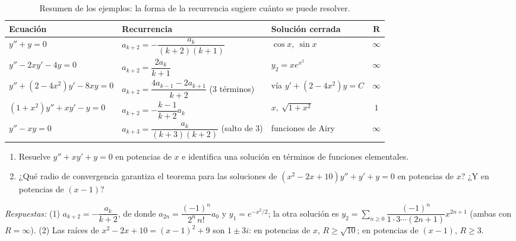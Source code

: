 \begin{table}[H]
\centering
\small
\caption{Resumen de los ejemplos: la forma de la recurrencia sugiere cuánto se puede resolver.}
\label{tab:s2-resumen}
\begin{tabular}{|p{3.9cm}|p{4.2cm}|p{4.1cm}|c|}
\hline
\rowcolor{bbe!15}\textbf{Ecuación} & \textbf{Recurrencia} & \textbf{Solución cerrada} & $\mathbf{R}$ \\ \hline
$y''+y=0$ & $a_{k+2}=-\dfrac{a_k}{(k+2)(k+1)}$ & $\cos x,\ \sin x$ & $\infty$ \\ \hline
$y''-2xy'-4y=0$ & $a_{k+2}=\dfrac{2a_k}{k+1}$ & $y_2=xe^{x^2}$ & $\infty$ \\ \hline
$y''+(2-4x^2)y'-8xy=0$ & $a_{k+2}=\dfrac{4a_{k-1}-2a_{k+1}}{k+2}$ (3 términos) & vía $y'+(2-4x^2)y=C$ & $\infty$ \\ \hline
$(1+x^2)y''+xy'-y=0$ & $a_{k+2}=-\dfrac{k-1}{k+2}a_k$ & $x,\ \sqrt{1+x^2}$ & $1$ \\ \hline
$y''-xy=0$ & $a_{k+3}=\dfrac{a_k}{(k+3)(k+2)}$ (salto de 3) & funciones de Airy & $\infty$ \\ \hline
\end{tabular}
\end{table}
 
\begin{exercise}
\begin{enumerate}
\item Resuelve $y''+xy'+y=0$ en potencias de $x$ e identifica una solución en términos de funciones elementales.
\item ¿Qué radio de convergencia garantiza el teorema para las soluciones de $(x^2-2x+10)y''+y'+y=0$ en potencias de $x$? ¿Y en potencias de $(x-1)$?
\end{enumerate}
\emph{Respuestas:} (1) $a_{k+2}=-\dfrac{a_k}{k+2}$, de donde $a_{2n}=\dfrac{(-1)^n}{2^n\,n!}a_0$ y $y_1=e^{-x^2/2}$; la otra solución es $y_2=\sum_{n\ge0}\dfrac{(-1)^n}{1\cdot3\cdots(2n+1)}x^{2n+1}$ (ambas con $R=\infty$). \; (2) Las raíces de $x^2-2x+10=(x-1)^2+9$ son $1\pm3i$: en potencias de $x$, $R\ge\sqrt{10}$; en potencias de $(x-1)$, $R\ge 3$.
\end{exercise}
